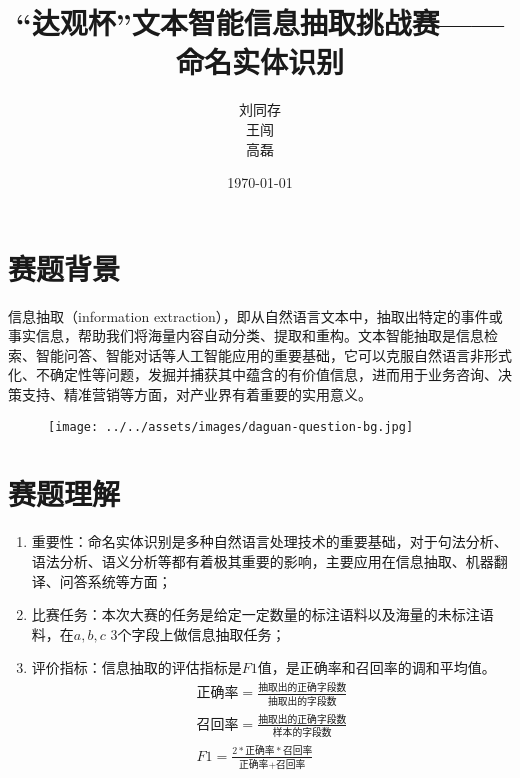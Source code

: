 \documentclass[9pt,aspectratio=169]{ctexbeamer}
\title{“达观杯”文本智能信息抽取挑战赛——命名实体识别}
\author{刘同存\\王闯\\高磊}
\date{\today}
\begin{document}
	
	\begin{frame}
		\titlepage
	\end{frame}
	\section{赛题背景}
	\begin{frame}
		信息抽取（information extraction），即从自然语言文本中，抽取出特定的事件或事实信息，帮助我们将海量内容自动分类、提取和重构。文本智能抽取是信息检索、智能问答、智能对话等人工智能应用的重要基础，它可以克服自然语言非形式化、不确定性等问题，发掘并捕获其中蕴含的有价值信息，进而用于业务咨询、决策支持、精准营销等方面，对产业界有着重要的实用意义。
		
		\begin{figure}
			\centering
			
			\texttt{[image: ../../assets/images/daguan-question-bg.jpg]}
		\end{figure}
	\end{frame}

	\section{赛题理解}
	\begin{frame}
		
		\begin{enumerate}
			\item 重要性：命名实体识别是多种自然语言处理技术的重要基础，对于句法分析、语法分析、语义分析等都有着极其重要的影响，主要应用在信息抽取、机器翻译、问答系统等方面；
			\item 比赛任务：本次大赛的任务是给定一定数量的标注语料以及海量的未标注语料，在$a,b,c$ 3个字段上做信息抽取任务；
			\item 评价指标：信息抽取的评估指标是$F1$值，是正确率和召回率的调和平均值。\begin{gather*}
			\text{正确率} = \frac{\text{抽取出的正确字段数}}{\text{抽取出的字段数}} \\
			\text{召回率} = \frac{\text{抽取出的正确字段数}}{\text{样本的字段数}}\\
			F1 = \frac{2 * \text{正确率}*\text{召回率}}{\text{正确率}+\text{召回率}}
			\end{gather*}
		\end{enumerate}
		
	\end{frame}
\end{document}
